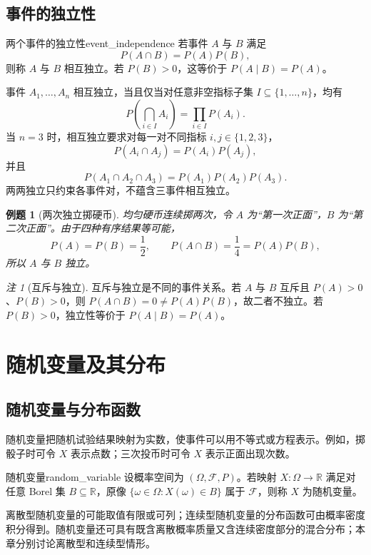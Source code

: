 \documentclass[11pt,a4paper,fontset=fandol]{ctexart}
\newtheorem{example}{例题}[section]
\theoremstyle{remark}
\newtheorem{remark}{注}[section]
\begin{document}
\subsection{事件的独立性}
\begin{definition}{两个事件的独立性}{event_independence}
若事件 $A$ 与 $B$ 满足
\[
    P(A\cap B)=P(A)P(B),
\]
则称 $A$ 与 $B$ 相互独立。若 $P(B)>0$，这等价于 $P(A\mid B)=P(A)$。
\end{definition}

事件 $A_1,\ldots,A_n$ 相互独立，当且仅当对任意非空指标子集 $I\subseteq\{1,\ldots,n\}$，均有
\[
    P\left(\bigcap_{i\in I}A_i\right)=\prod_{i\in I}P(A_i).
\]
当 $n=3$ 时，相互独立要求对每一对不同指标 $i,j\in\{1,2,3\}$，
\[
    P(A_i\cap A_j)=P(A_i)P(A_j),
\]
并且
\[
    P(A_1\cap A_2\cap A_3)=P(A_1)P(A_2)P(A_3).
\]
两两独立只约束各事件对，不蕴含三事件相互独立。

\begin{example}[两次独立掷硬币]
均匀硬币连续掷两次，令 $A$ 为“第一次正面”，$B$ 为“第二次正面”。由于四种有序结果等可能，
\[
    P(A)=P(B)=\frac{1}{2},\qquad
    P(A\cap B)=\frac{1}{4}=P(A)P(B),
\]
所以 $A$ 与 $B$ 独立。
\end{example}

\begin{remark}[互斥与独立]
互斥与独立是不同的事件关系。若 $A$ 与 $B$ 互斥且 $P(A)>0$、$P(B)>0$，则 $P(A\cap B)=0\ne P(A)P(B)$，故二者不独立。若 $P(B)>0$，独立性等价于 $P(A\mid B)=P(A)$。
\end{remark}

\clearpage
\section{随机变量及其分布}
\subsection{随机变量与分布函数}
随机变量把随机试验结果映射为实数，使事件可以用不等式或方程表示。例如，掷骰子时可令 $X$ 表示点数；三次投币时可令 $X$ 表示正面出现次数。

\begin{definition}{随机变量}{random_variable}
设概率空间为 $(\Omega,\mathcal{F},P)$。若映射 $X:\Omega\to\mathbb{R}$ 满足对任意 Borel 集 $B\subseteq\mathbb{R}$，原像 $\{\omega\in\Omega:X(\omega)\in B\}$ 属于 $\mathcal{F}$，则称 $X$ 为随机变量。
\end{definition}

离散型随机变量的可能取值有限或可列；连续型随机变量的分布函数可由概率密度积分得到。随机变量还可具有既含离散概率质量又含连续密度部分的混合分布；本章分别讨论离散型和连续型情形。
\end{document}
